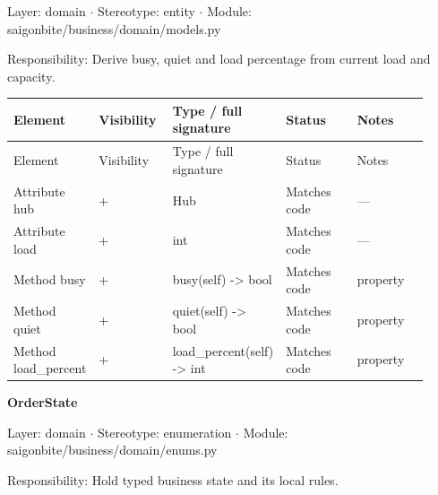 Layer: domain \ensuremath{\cdot} Stereotype: \guillemotleft{}entity\guillemotright{} \ensuremath{\cdot} Module: saigonbite/business/domain/models.py

Responsibility: Derive busy, quiet and load percentage from current load and capacity.

\begin{longtable}{>{\raggedright\arraybackslash}p{0.1840\linewidth}>{\raggedright\arraybackslash}p{0.1840\linewidth}>{\raggedright\arraybackslash}p{0.1840\linewidth}>{\raggedright\arraybackslash}p{0.1840\linewidth}>{\raggedright\arraybackslash}p{0.1840\linewidth}}
Element & Visibility & Type / full signature & Status & Notes \\
\hline\endfirsthead
Element & Visibility & Type / full signature & Status & Notes \\
\hline\endhead
Attribute hub & + & Hub & Matches code & --- \\
Attribute load & + & int & Matches code & --- \\
Method busy & + & busy(self) -\textgreater{} bool & Matches code & property \\
Method quiet & + & quiet(self) -\textgreater{} bool & Matches code & property \\
Method load\_percent & + & load\_percent(self) -\textgreater{} int & Matches code & property \\
\end{longtable}
\textbf{OrderState}

Layer: domain \ensuremath{\cdot} Stereotype: \guillemotleft{}enumeration\guillemotright{} \ensuremath{\cdot} Module: saigonbite/business/domain/enums.py

Responsibility: Hold typed business state and its local rules.

